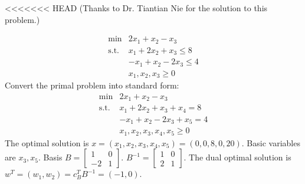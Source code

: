 \documentclass[12pt]{article}
\begin{document}
<<<<<<< HEAD
(Thanks to Dr. Tiantian Nie for the solution to this problem.)

\begin{equation*}
  \begin{array}{rl}
    \min & 2x_1+x_2-x_3 \\
    \text{s.t.} & x_1+2x_2+x_3\leq 8 \\
    & -x_1 + x_2 - 2x_3 \leq 4 \\
    & x_1,x_2,x_3 \geq 0
  \end{array}
\end{equation*}
Convert the primal problem into standard form:
  \begin{equation*}
  \begin{array}{rl}
    \min & 2x_1+x_2-x_3 \\
    \text{s.t.} & x_1+2x_2+x_3 + x_4 = 8 \\
    & -x_1 + x_2 - 2x_3 + x_5 = 4 \\
    & x_1,x_2,x_3,x_4,x_5 \geq 0
  \end{array}
  \end{equation*}
  The optimal solution is $x=(x_1,x_2,x_3,x_4,x_5)=(0,0,8,0,20)$. Basic variables are $x_3,x_5$. Basis $B=\begin{bmatrix}1& 0 \\-2& 1\end{bmatrix}$. $B^{-1}=\begin{bmatrix}1& 0 \\2& 1\end{bmatrix}$. The dual optimal solution is $w^T=(w_1,w_2)=c_B^TB^{-1}=(-1,0)$.
\end{document}
